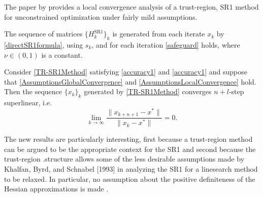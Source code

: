 The paper by \cite{ByrdKhalfanSchnabel:1996} provides a local convergence analysis of a trust-region, SR1 method for unconstrained optimization under fairly mild assumptions. 

\begin{assumption}\label{AssumptionsLocalConvergence}
    The sequence of matrices $\{ H^{\mathrm{SR1}}_k \}_k$ is generated from each iterate $x_k$ by \cref{directSR1formula}, using $s_k$, and for each iteration \cref{safeguard} holds, where $\nu \in (0, 1)$ is a constant.
\end{assumption}

\begin{theorem} \label{LocalConvergence}
    Consider \cref{TR-SR1Method} satisfying \cref{accuracy1} and \cref{accuracy1} and suppose that \cref{AssumptionsGlobalConvergence} and \cref{AssumptionsLocalConvergence} hold. Then the sequence $\{ x_k \}_k$ generated by \cref{TR-SR1Method} converges $n+l$-step superlinear, i.e. 
    \begin{equation}\label{n+1superlinear}
        \lim_{k \rightarrow \infty} \frac{\lVert x_{k+n+1} - x^* \rVert}{\lVert x_k - x^* \rVert} = 0.
    \end{equation}
\end{theorem}

The new results are particularly interesting, first because a trust-region method can be argued to be the appropriate context for the SR1 and second because the trust-region .structure allows some of the less desirable assumptions made by Khalfan, Byrd, and Schnabel [1993] in analyzing the SR1 for a linesearch method to be relaxed. In particular, no assumption about the positive definiteness of the Hessian approximations is made \cite[p.~1025]{ByrdKhalfanSchnabel:1996}.
